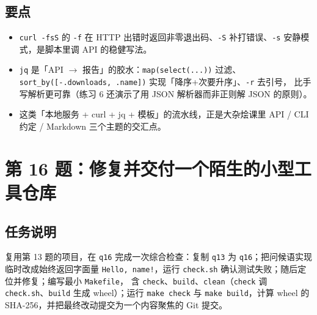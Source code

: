 \documentclass{hamesome-report}
\begin{document}
\subsection{要点}
\begin{itemize}
\item \texttt{curl -fsS} 的 \texttt{-f} 在 HTTP 出错时返回非零退出码、\texttt{-S}
补打错误、\texttt{-s} 安静模式，是脚本里调 API 的稳健写法。
\item \texttt{jq} 是「API $\to$ 报告」的胶水：\texttt{map(select(...))} 过滤、
\texttt{sort\_by([-.downloads, .name])} 实现「降序+次要升序」、\texttt{-r} 去引号，
比手写解析更可靠（练习 6 还演示了用 JSON 解析器而非正则解 JSON 的原则）。
\item 这类「本地服务 + curl + jq + 模板」的流水线，正是大杂烩课里
API / CLI 约定 / Markdown 三个主题的交汇点。
\end{itemize}

\section{第 16 题：修复并交付一个陌生的小型工具仓库}
\subsection{任务说明}
复用第 13 题的项目，在 \texttt{q16} 完成一次综合检查：复制 \texttt{q13} 为
\texttt{q16}；把问候语实现临时改成始终返回字面量 \texttt{Hello, name!}，运行
\texttt{check.sh} 确认测试失败；随后定位并修复；编写最小 \texttt{Makefile}，
含 \texttt{check}、\texttt{build}、\texttt{clean}（\texttt{check} 调
\texttt{check.sh}、\texttt{build} 生成 wheel）；运行 \texttt{make\ check} 与
\texttt{make\ build}，计算 wheel 的 SHA-256，并把最终改动提交为一个内容聚焦的 Git 提交。
\end{document}
